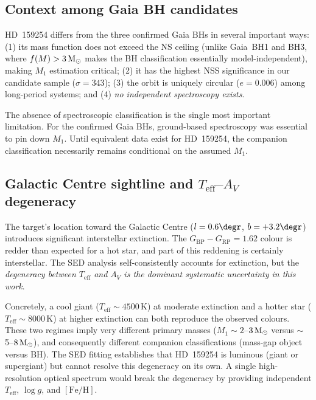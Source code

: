 \documentclass[usenatbib,fleqn]{mnras}
\newcommand{\Msun}{{\rm M}_\odot}
\newcommand{\fmass}{f(M)}
\begin{document}
\subsection{Context among Gaia BH candidates}
\label{sec:discussion:context}

HD~159254 differs from the three confirmed Gaia BHs in several
important ways: (1) its mass function does not exceed the NS
ceiling (unlike Gaia~BH1 and BH3, where $\fmass > 3\,\Msun$
makes the BH classification essentially model-independent),
making $M_1$ estimation critical; (2) it has the highest NSS
significance in our candidate sample ($\sigma = 343$); (3) the
orbit is uniquely circular ($e = 0.006$) among long-period
systems; and (4) \emph{no independent spectroscopy exists}.

The absence of spectroscopic classification is the single most
important limitation.  For the confirmed Gaia BHs, ground-based
spectroscopy was essential to pin down $M_1$.  Until equivalent
data exist for HD~159254, the companion classification necessarily
remains conditional on the assumed $M_1$.

\subsection{Galactic Centre sightline and $T_\mathrm{eff}$--$A_V$ degeneracy}
\label{sec:discussion:gc}

The target's location toward the Galactic Centre
($l = 0.6\degr$, $b = +3.2\degr$) introduces significant
interstellar extinction.  The $G_\mathrm{BP} - G_\mathrm{RP}
= 1.62$ colour is redder than expected for a hot star, and part
of this reddening is certainly interstellar.  The SED analysis
self-consistently accounts for extinction, but the \emph{degeneracy
between $T_\mathrm{eff}$ and $A_V$ is the dominant systematic
uncertainty in this work}.

Concretely, a cool giant ($T_\mathrm{eff} \sim 4500$\,K) at
moderate extinction and a hotter star ($T_\mathrm{eff} \sim
8000$\,K) at higher extinction can both reproduce the observed
colours.  These two regimes imply very different primary masses
($M_1 \sim 2$--$3\,\Msun$ versus $\sim$5--$8\,\Msun$), and
consequently different companion classifications (mass-gap
object versus BH).  The SED fitting establishes that HD~159254
is luminous (giant or supergiant) but cannot resolve this
degeneracy on its own.  A single high-resolution optical spectrum
would break the degeneracy by providing independent
$T_\mathrm{eff}$, $\log g$, and $[\text{Fe/H}]$.
\end{document}
